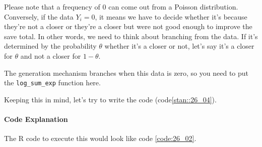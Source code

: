 \documentclass{ltjsbook}
\begin{document}
	Please note that a frequency of 0 can come out from a Poisson distribution. Conversely, if the data $Y_i=0$, it means we have to decide whether it's because they're not a closer or they're a closer but were not good enough to improve the save total. In other words, we need to think about branching from the data. If it's determined by the probability $\theta$ whether it's a closer or not, let's say it's a closer for $\theta$ and not a closer for $1-\theta$.

The generation mechanism branches when this data is zero, so you need to put the \verb|log_sum_exp| function here.

Keeping this in mind, let's try to write the code (code\ref{stan::26_04}).

\paragraph{Code Explanation}


The R code to execute this would look like code \ref{code:26_02}.

\end{document}
